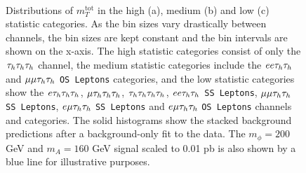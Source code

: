 \begin{figure}[!hbtp]
\centering
     \\
\caption[Plots of the $m_{T}^\text{tot}$ distributions in the $\tau\tau\tau\tau$ channels and categories.]{Distributions of $m_{T}^\text{tot}$ in the high (a), medium (b) and low (c) statistic categories. As the bin sizes vary drastically between channels, the bin sizes are kept constant and the bin intervals are shown on the x-axis. The high statistic categories consist of only the $\tau_{h}\tau_{h}\tau_{h}$ channel, the medium statistic categories include the $ee\tau_{h}\tau_{h}$ and $\mu\mu\tau_{h}\tau_{h}$ \texttt{OS Leptons} categories, and the low statistic categories show the $e\tau_{h}\tau_{h}\tau_{h}$, $\mu\tau_{h}\tau_{h}\tau_{h}$, $\tau_{h}\tau_{h}\tau_{h}\tau_{h}$,  $ee\tau_{h}\tau_{h}$ \texttt{SS Leptons}, $\mu\mu\tau_{h}\tau_{h}$ \texttt{SS Leptons}, $e\mu\tau_{h}\tau_{h}$ \texttt{SS Leptons} and $e\mu\tau_{h}\tau_{h}$ \texttt{OS Leptons} channels and categories. The solid histograms show the stacked background predictions after a background-only fit to the data. The $m_{\phi}=200$ GeV and $m_{A}=160$ GeV signal scaled to 0.01 pb is also shown by a blue line for illustrative purposes.}
\label{fig:4tau_postfit}
\end{figure}


